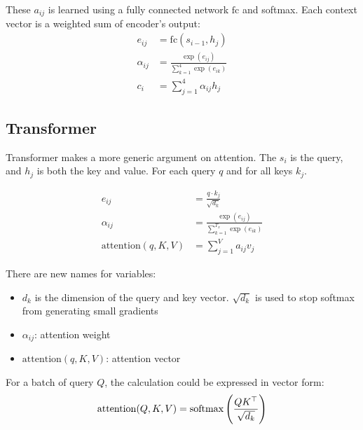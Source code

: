  These $a_{ij}$ is learned using a fully connected network $\mathrm{fc}$ and softmax. Each context vector is a weighted sum of encoder's output:
\begin{equation}
    \begin{aligned}
        e_{ij} &= \mathrm{fc}(s_{i-1}, h_j) \\
        \alpha_{ij} &= \frac{\exp(e_{ij})}{\displaystyle \sum_{k=1}^4 \exp(e_{ik})} \\
        c_i &= \sum_{j=1}^4 \alpha_{ij} h_j
    \end{aligned}
\end{equation}


\subsection{Transformer}

\begin{definition}
    Transformer makes a more generic argument on attention. The $s_i$ is the query, and $h_j$ is both the key and value. For each query $q$ and for all keys $k_j$.

\begin{equation}
    \begin{aligned}
        e_{ij} &= \frac{q \cdot k_j}{\sqrt{d_k}} \\
        \alpha_{ij} &= \frac{\exp(e_{ij})}{\displaystyle \sum_{k=1}^{T_x} \exp(e_{ik})} \\
        \mathrm{attention}(q, K, V) &= \sum_{j=1}^{V} a_{ij} v_j
    \end{aligned}
\end{equation}

There are new names for variables:
\begin{itemize}
    \item $d_k$ is the dimension of the query and key vector. $\sqrt{d_k}$ is used to stop softmax from generating small gradients
    \item $\alpha_{ij}$: attention weight
    \item $\mathrm{attention}(q, K, V)$: attention vector
\end{itemize}

For a batch of query $Q$, the calculation could be expressed in vector form:
\begin{equation}
    \mathrm{attention}(Q, K, V) = \mathrm{softmax}\left( \frac{Q {K}^\top}{\sqrt{d_k}} \right)
\end{equation}
\end{definition}


